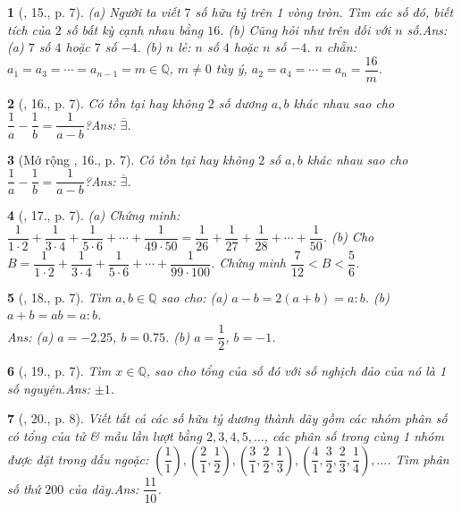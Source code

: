 \documentclass{article}
\newtheorem{baitoan}{}
\begin{document}
\begin{baitoan}[\cite{Binh_Toan_7_tap_1}, 15., p. 7]
	(a) Người ta viết $7$ số hữu tỷ trên 1 vòng tròn. Tìm các số đó, biết tích của $2$ số bất kỳ cạnh nhau bằng $16$. (b) Cũng hỏi như trên đối với $n$ số.\hfill{\sf Ans: (a) $7$ số $4$ hoặc $7$ số $-4$. (b) $n$ lẻ: $n$ số $4$ hoặc $n$ số $-4$. $n$ chẵn: $a_1 = a_3 = \cdots = a_{n-1} = m\in\mathbb{Q}$, $m\ne 0$ tùy ý, $a_2 = a_4 = \cdots = a_n = \dfrac{16}{m}$.}
\end{baitoan}

\begin{baitoan}[\cite{Binh_Toan_7_tap_1}, 16., p. 7]
	Có tồn tại hay không $2$ số dương $a,b$ khác nhau sao cho $\dfrac{1}{a} - \dfrac{1}{b} = \dfrac{1}{a - b}$?\hfill{\sf Ans: $\overline{\exists}$.}
\end{baitoan}

\begin{baitoan}[Mở rộng \cite{Binh_Toan_7_tap_1}, 16., p. 7]
	Có tồn tại hay không $2$ số $a,b$ khác nhau sao cho $\dfrac{1}{a} - \dfrac{1}{b} = \dfrac{1}{a - b}$?\hfill{\sf Ans: $\overline{\exists}$.}
\end{baitoan}

\begin{baitoan}[\cite{Binh_Toan_7_tap_1}, 17., p. 7]
	(a) Chứng minh: $\dfrac{1}{1\cdot 2} + \dfrac{1}{3\cdot 4} + \dfrac{1}{5\cdot 6} + \cdots + \dfrac{1}{49\cdot 50} = \dfrac{1}{26} + \dfrac{1}{27} + \dfrac{1}{28} + \cdots + \dfrac{1}{50}$. (b) Cho $B = \dfrac{1}{1\cdot 2} + \dfrac{1}{3\cdot 4} + \dfrac{1}{5\cdot 6} + \cdots + \dfrac{1}{99\cdot 100}$. Chứng minh $\dfrac{7}{12} < B < \dfrac{5}{6}$.		
\end{baitoan}

\begin{baitoan}[\cite{Binh_Toan_7_tap_1}, 18., p. 7]
	Tìm $a,b\in\mathbb{Q}$ sao cho: (a) $a - b = 2(a + b) = a:b$. (b) $a + b = ab = a:b$.
	\\\mbox{}\hfill{\sf Ans: (a) $a = -2.25$, $b = 0.75$. (b) $a = \dfrac{1}{2}$, $b = -1$.}
\end{baitoan}

\begin{baitoan}[\cite{Binh_Toan_7_tap_1}, 19., p. 7]
	Tìm $x\in\mathbb{Q}$, sao cho tổng của số đó với số nghịch đảo của nó là 1 số nguyên.\hfill{\sf Ans: $\pm 1$.}
\end{baitoan}

\begin{baitoan}[\cite{Binh_Toan_7_tap_1}, 20., p. 8]
	Viết tất cả các số hữu tỷ dương  thành dãy gồm các nhóm phân số có tổng của tử \& mẫu lần lượt bằng $2,3,4,5,\ldots$, các phân số trong cùng 1 nhóm được đặt trong dấu ngoặc: $\left(\dfrac{1}{1}\right),\left(\dfrac{2}{1},\dfrac{1}{2}\right),\left(\dfrac{3}{1},\dfrac{2}{2},\dfrac{1}{3}\right),\left(\dfrac{4}{1},\dfrac{3}{2},\dfrac{2}{3},\dfrac{1}{4}\right),\ldots$. Tìm phân số thứ $200$ của dãy.\hfill{\sf Ans: $\dfrac{11}{10}$.}
\end{baitoan}
\end{document}
